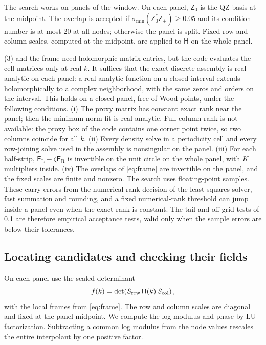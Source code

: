 The search works on panels of the window. On each panel, $\mathsf Z_0$ is the
QZ basis at the midpoint. The overlap is accepted if
$\sigma_{\min}(\mathsf Z_0^*\mathsf Z_\pm)\ge0.05$ and its condition number is at most
$20$ at all nodes; otherwise the panel is split. Fixed row and column scales,
computed at the midpoint, are applied to $\mathsf H$ on the whole panel.

\begin{remark}\label{rem:holomorphy}
(3) and the frame need holomorphic matrix entries, but the
code evaluates the cell matrices only at real $k$. It suffices that the exact
discrete assembly is real-analytic on each panel: a real-analytic function on
a closed interval extends holomorphically to a complex neighborhood, with the
same zeros and orders on the interval. This holds on a closed panel, free of
Wood points, under the following conditions.
(i) The proxy matrix has constant exact rank near the panel; then the
minimum-norm fit is real-analytic. Full column rank is not available: the
proxy box of the code contains one corner point twice, so two columns
coincide for all $k$.
(ii) Every density solve in a periodicity cell and every row-joining solve used in the
assembly is nonsingular on the panel.
(iii) For each half-strip, $\mathsf E_{\mathrm L}-\zeta\mathsf E_{\mathrm R}$ is invertible on
the unit circle on the whole panel,
with $K$ multipliers inside.
(iv) The overlaps of \eqref{eq:frame} are invertible on the panel, and the
fixed scales are finite and nonzero.
The search uses floating-point samples. These carry errors from the numerical
rank decision of the least-squares solver, fast summation and rounding, and a
fixed numerical-rank threshold can jump inside a panel even when the exact
rank is constant. The tail and off-grid tests of \cref{sec:search} are
therefore empirical acceptance tests, valid only when the sample errors are
below their tolerances.
\end{remark}


\subsection{Locating candidates and checking their fields}\label{sec:search}
On each panel use the scaled determinant
\[
 f(k)=\det\!\left(S_{\rm row}\,\mathsf H(k)\,S_{\rm col}\right),
\]
with the local frames from \eqref{eq:frame}. The row and column scales are
diagonal and fixed at the panel midpoint. We compute the log modulus and
phase by LU factorization. Subtracting a common log modulus from the node
values rescales the entire interpolant by one positive factor.

